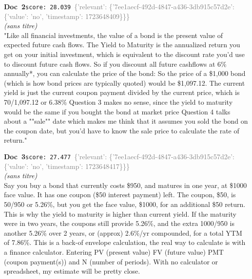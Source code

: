 \documentclass[a4paper,11pt]{article}
\begin{document}
\begin{docenv}
{\footnotesize\textcolor{doccolor}{\textbf{Doc~2}}}\hfill{\tiny\texttt{score:~28.039}}\ {\tiny\textcolor{gray}{\{'relevant': \{'7ee1aecf-492d-4847-a436-3db915c57d2e': \{'value': 'no', 'timestamp': 1723648409\}\}\}}}\\[3pt]
{\small\textit{(sans titre)}}\\[2pt]
\vspace{2pt}
{\footnotesize 
"Like all financial investments, the value of a bond is the present value of expected future cash flows.  The Yield to Maturity is the annualized return you get on your initial investment, which is equivalent to the discount rate you'd use to discount future cash flows. So if you discount all future cashflows at 6\% annually*, you can calculate the price of the bond: So the price of a \$1,000 bond (which is how bond prices are typically quoted) would be \$1,097.12. The current yield is just the current coupon payment divided by the current price, which is 70/1,097.12 or 6.38\% Question 3 makes no sense, since the yield to maturity would be the same if you bought the bond at market price Question 4 talks about a ""sale"" date which makes me think that it assumes you sold the bond on the coupon date, but you'd have to know the sale price to calculate the rate of return."}
\end{docenv}
\begin{docenv}
{\footnotesize\textcolor{doccolor}{\textbf{Doc~3}}}\hfill{\tiny\texttt{score:~27.477}}\ {\tiny\textcolor{gray}{\{'relevant': \{'7ee1aecf-492d-4847-a436-3db915c57d2e': \{'value': 'no', 'timestamp': 1723648417\}\}\}}}\\[3pt]
{\small\textit{(sans titre)}}\\[2pt]
\vspace{2pt}
{\footnotesize 
Say you buy a bond that currently costs \$950, and matures in one year, at \$1000 face value. It has one coupon (\$50 interest payment) left. The coupon, \$50, is 50/950 or 5.26\%, but you get the face value, \$1000, for an additional \$50 return. This is why the yield to maturity is higher than current yield. If the maturity were in two years, the coupons still provide 5.26\%, and the extra 1000/950 is another 5.26\% over 2 years, or (approx) 2.6\%/yr compounded, for a total YTM of 7.86\%. This is a back-of envelope calculation, the real way to calculate is with a finance calculator. Entering PV (present value) FV (future value) PMT (coupon payment(s)) and N (number of periods). With no calculator or spreadsheet, my estimate will be pretty close.}
\end{docenv}
\end{document}
